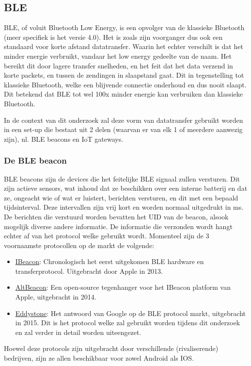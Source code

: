 \subsection{BLE}
\label{sec:BLE}
BLE, of voluit Bluetooth Low Energy, is een opvolger van de klassieke Bluetooth (meer specifiek is het versie 4.0). Het is zoals zijn voorganger dus ook een standaard voor korte afstand datatransfer. Waarin het echter verschilt is dat het minder energie verbruikt, vandaar het low energy gedeelte van de naam. Het bereikt dit door lagere transfer snelheden, en het feit dat het data verzend in korte packets, en tussen de zendingen in slaapstand gaat. Dit in tegenstelling tot klassieke Bluetooth, welke een blijvende connectie onderhoud en dus nooit slaapt. Dit betekend dat BLE tot wel 100x minder energie kan verbruiken dan klassieke Bluetooth. \autocite{Nesbo2021}

In de context van dit onderzoek zal deze vorm van datatransfer gebruikt worden in een set-up die bestaat uit 2 delen (waarvan er van elk 1 of meerdere aanwezig zijn), nl. BLE beacons en IoT gateways.

\subsubsection{De BLE beacon}
BLE beacons zijn de devices die het feitelijke BLE signaal zullen versturen. Dit zijn actieve sensors, wat inhoud dat ze beschikken over een interne batterij en dat ze, ongeacht wie of wat er luistert, berichten versturen, en dit met een bepaald tijdsinterval. Deze intervallen zijn vrij kort en worden normaal uitgedrukt in ms.\autocite{Adarsh2022}
De berichten die verstuurd worden bevatten het UID van de beacon, alsook mogelijk diverse andere informatie. De informatie die verzonden wordt hangt echter af van het protocol welke gebruikt wordt. Momenteel zijn de 3 voornaamste protocollen op de markt de volgende:
\begin{itemize}
	\item \underline{IBeacon}:
	Chronologisch het eerst uitgekomen BLE hardware en transferprotocol. Uitgebracht door Apple in 2013. 
	\item \underline{AltBeacon}:
	Een open-source tegenhanger voor het IBeacon platform van Apple, uitgebracht in 2014.
	\item \underline{Eddystone}:
	Het antwoord van Google op de BLE protocol markt, uitgebracht in 2015. Dit is het protocol welke zal gebruikt worden tijdens dit onderzoek en zal verder in detail worden uiteengezet.
\end{itemize}
Hoewel deze protocols zijn uitgebracht door verschillende (rivaliserende) bedrijven, zijn ze allen beschikbaar voor zowel Android als IOS.\autocite{Smart2022}


